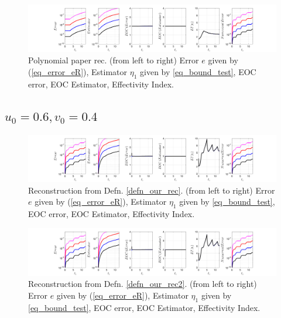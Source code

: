 \documentclass[12pt,a4paper]{article}
\numberwithin{equation}{section}
\theoremstyle{definition}
\begin{document}
\begin{figure}[H]
	\hspace{-3cm}
	\includegraphics[scale=0.55]{fig_LeapFrogplots_1x5_sin_IC_harmonic_u5_v5_paperrec_poly}	
	\caption{Polynomial paper rec. (from left to right) Error $e$ given by (\ref{eq_error_eR}), Estimator $\eta_1$ given by \ref{eq_bound_test},   EOC error, EOC Estimator, Effectivity Index.}
	\label{fig_all_in_one_paperrec_poly_u05_v05}
\end{figure}

\subsection*{$u_0=0.6, v_0= 0.4$}
\begin{figure}[H]
	\hspace{-3cm}
	\includegraphics[scale=0.55]{fig_LeapFrogplots_1x5_sin_IC_harmonic_order_2_u6_v4_rec_george}	
	\caption{Reconstruction from Defn. \ref{defn_our_rec}. (from left to right) Error $e$ given by (\ref{eq_error_eR}), Estimator $\eta_1$ given by \ref{eq_bound_test}, EOC error, EOC Estimator, Effectivity Index.}
	\label{fig_all_in_one_our_rec_george_u6_v4}
\end{figure}
\begin{figure}[H]
	\hspace{-3cm}
	\includegraphics[scale=0.55]{fig_LeapFrogplots_1x5_sin_IC_harmonic_order_2_u6_v4_rec2}	
	\caption{Reconstruction from Defn. \ref{defn_our_rec2}. (from left to right) Error $e$ given by (\ref{eq_error_eR}), Estimator $\eta_1$ given by \ref{eq_bound_test},  EOC error, EOC Estimator, Effectivity Index.}
	\label{fig_all_in_one_our_rec_2_u6_v4}
\end{figure}
\end{document}
